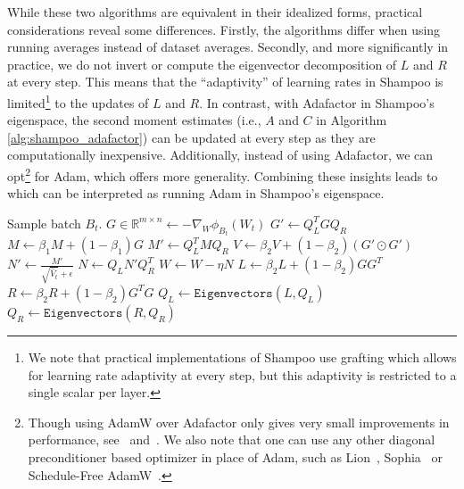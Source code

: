 \documentclass{article} %
\begin{document}
While these two algorithms are equivalent in their idealized forms, practical considerations reveal some differences. Firstly, the algorithms differ when using running averages instead of dataset averages.
Secondly, and more significantly in practice, we do not invert or compute the eigenvector decomposition of $L$ and $R$ at every step. This means that the ``adaptivity'' of learning rates in Shampoo is limited\footnote{We note that practical implementations of Shampoo use grafting which allows for learning rate adaptivity at every step, but this adaptivity is restricted to a single scalar per layer.} to the updates of $L$ and $R$. In contrast, with Adafactor in Shampoo's eigenspace, the second moment estimates (i.e., $A$ and $C$ in Algorithm \ref{alg:shampoo_adafactor}) can be updated at every step as they are computationally inexpensive. Additionally, instead of using Adafactor, we can opt\footnote{Though using AdamW over Adafactor only gives very small improvements in performance, see~ and~. We also note that one can use any other diagonal preconditioner based optimizer in place of Adam, such as Lion~\citep{lion}, Sophia~\citep{liu2024sophia} or Schedule-Free AdamW~\citep{schedulefree}.} for Adam, which offers more generality. Combining these insights leads to~ which can be interpreted as running Adam in Shampoo's eigenspace.

\begin{algorithm}[t]
	
	\begin{algorithmic}[1]
		\STATE Sample batch $B_t$.
		\STATE $G \in \mathbb{R}^{m \times n} \gets -\nabla_W \phi_{B_t}(W_t)$
		\STATE $G' \gets Q_L^T G Q_R$
		\STATE $M \gets \beta_1 M + (1-\beta_1) G$
		\STATE $M' \gets Q_L^T M Q_R$
		\STATE {}
		\STATE $V \gets \beta_2 V + (1-\beta_2) (G' \odot G')$ 
		\STATE $N' \gets \frac{M'}{\sqrt{\hat{V}_t} + \epsilon}$ 
		\STATE {}
		\STATE $N \gets Q_L N' Q_R^T$ 
		\STATE $W \gets W - \eta N$
		\STATE {}
		\STATE $L \gets \beta_2  L + (1-\beta_2) GG^T$
		\STATE $R \gets \beta_2  R + (1-\beta_2) G^TG$
		\STATE $Q_L \gets \texttt{Eigenvectors}(L, Q_L)$
		\STATE $Q_R \gets \texttt{Eigenvectors}(R, Q_R)$
		\ENDIF
	\end{algorithmic}
	\caption{Single step of SOAP for a $m \times n$ layer. Per layer, we  maintain four matrices: $L \in \mathbb{R}^{m \times m}, R \in \mathbb{R}^{n \times n}$ and $V, M \in \mathbb{R}^{m \times n}$. For simplicity we  ignore the initialization and other boundary effects such as bias correction. Hyperparameters: Learning rate $\eta$, $\text{betas} = (\beta_1, \beta_2)$, epsilon $\eps$, and preconditioning frequency $f$.\\ An implementation of SOAP is available at \url{https://github.com/nikhilvyas/SOAP/tree/main}.}%
	\label{alg:SOAP}
\end{algorithm}
\end{document}
